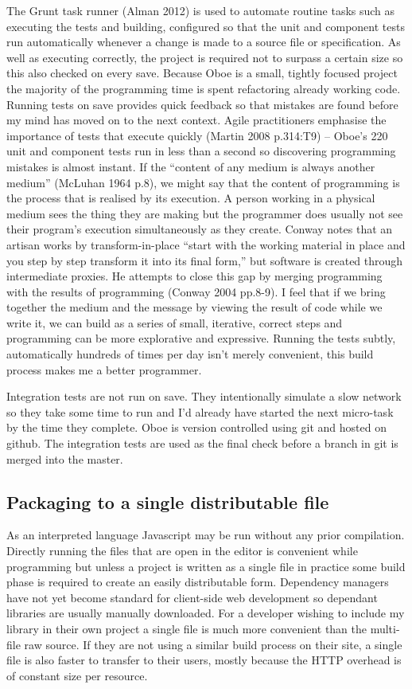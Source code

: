 \documentclass[12pt, ]{article}
\begin{document}
The Grunt task runner (Alman 2012) is used to automate routine tasks
such as executing the tests and building, configured so that the unit
and component tests run automatically whenever a change is made to a
source file or specification. As well as executing correctly, the
project is required not to surpass a certain size so this also checked
on every save. Because Oboe is a small, tightly focused project the
majority of the programming time is spent refactoring already working
code. Running tests on save provides quick feedback so that mistakes are
found before my mind has moved on to the next context. Agile
practitioners emphasise the importance of tests that execute quickly
(Martin 2008 p.314:T9) -- Oboe's 220 unit and component tests run in
less than a second so discovering programming mistakes is almost
instant. If the ``content of any medium is always another medium''
(McLuhan 1964 p.8), we might say that the content of programming is the
process that is realised by its execution. A person working in a
physical medium sees the thing they are making but the programmer does
usually not see their program's execution simultaneously as they create.
Conway notes that an artisan works by transform-in-place ``start with
the working material in place and you step by step transform it into its
final form,'' but software is created through intermediate proxies. He
attempts to close this gap by merging programming with the results of
programming (Conway 2004 pp.8-9). I feel that if we bring together the
medium and the message by viewing the result of code while we write it,
we can build as a series of small, iterative, correct steps and
programming can be more explorative and expressive. Running the tests
subtly, automatically hundreds of times per day isn't merely convenient,
this build process makes me a better programmer.

Integration tests are not run on save. They intentionally simulate a
slow network so they take some time to run and I'd already have started
the next micro-task by the time they complete. Oboe is version
controlled using git and hosted on github. The integration tests are
used as the final check before a branch in git is merged into the
master.

\subsection{Packaging to a single distributable
file}\label{packaging-to-a-single-distributable-file}

As an interpreted language Javascript may be run without any prior
compilation. Directly running the files that are open in the editor is
convenient while programming but unless a project is written as a single
file in practice some build phase is required to create an easily
distributable form. Dependency managers have not yet become standard for
client-side web development so dependant libraries are usually manually
downloaded. For a developer wishing to include my library in their own
project a single file is much more convenient than the multi-file raw
source. If they are not using a similar build process on their site, a
single file is also faster to transfer to their users, mostly because
the HTTP overhead is of constant size per resource.
\end{document}
